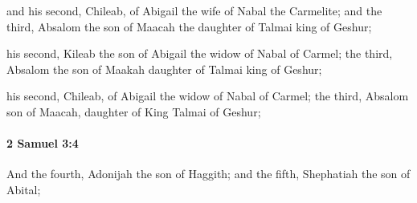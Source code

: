 			\begin{versebox}
					\item[BHS] 
					\item[ASV] and his second, Chileab, of Abigail the wife of Nabal the Carmelite; and the third, Absalom the son of Maacah the daughter of Talmai king of Geshur;
					\item[NIV] his second, Kileab the son of Abigail the widow of Nabal of Carmel; the third, Absalom the son of Maakah daughter of Talmai king of Geshur;
					\item[NRSV] his second, Chileab, of Abigail the widow of Nabal of Carmel; the third, Absalom son of Maacah, daughter of King Talmai of Geshur;
			\end{versebox}

		\paragraph{2 Samuel 3:4} %
			\label{2SAMUEL-3-4}

			And the fourth, Adonijah the son of Haggith; and the fifth, Shephatiah the son of Abital;

